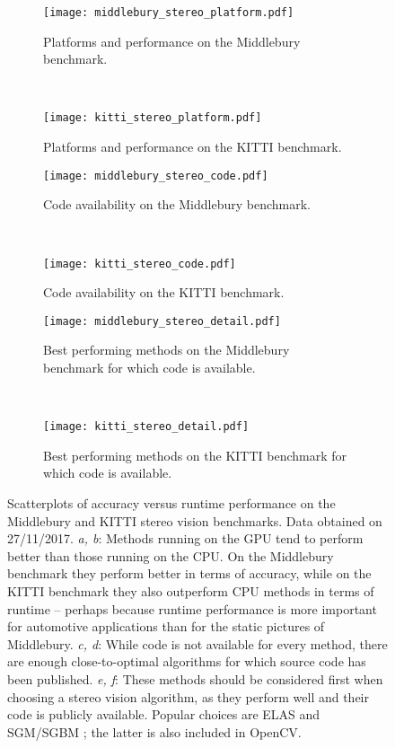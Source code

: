 \begin{figure}
\centering
\begin{subfigure}[t]{0.45\textwidth}
\centering
\texttt{[image: middlebury\_stereo\_platform.pdf]}
\caption{Platforms and performance on the Middlebury benchmark.}
\label{fig:mid_platform}
\end{subfigure}
~
\begin{subfigure}[t]{0.45\textwidth}
\centering
\texttt{[image: kitti\_stereo\_platform.pdf]}
\caption{Platforms and performance on the KITTI benchmark.}
\label{fig:kitti_platform}
\end{subfigure}

\begin{subfigure}[t]{0.45\textwidth}
\centering
\texttt{[image: middlebury\_stereo\_code.pdf]}
\caption{Code availability on the Middlebury benchmark.}
\end{subfigure}
~
\begin{subfigure}[t]{0.45\textwidth}
\centering
\texttt{[image: kitti\_stereo\_code.pdf]}
\caption{Code availability on the KITTI benchmark.}
\end{subfigure}

\begin{subfigure}[t]{0.45\textwidth}
\centering
\texttt{[image: middlebury\_stereo\_detail.pdf]}
\caption{Best performing methods on the Middlebury benchmark for which code is available.}
\end{subfigure}
~
\begin{subfigure}[t]{0.45\textwidth}
\centering
\texttt{[image: kitti\_stereo\_detail.pdf]}
\caption{Best performing methods on the KITTI benchmark for which code is available.}
\end{subfigure}
\caption{Scatterplots of accuracy versus runtime performance on the Middlebury and KITTI stereo vision benchmarks. Data obtained on 27/11/2017.
\emph{a, b}: Methods running on the GPU tend to perform better than those running on the CPU. On the Middlebury benchmark they perform better in terms of accuracy, while on the KITTI benchmark they also outperform CPU methods in terms of runtime -- perhaps because runtime performance is more important for automotive applications than for the static pictures of Middlebury.
\emph{c, d}: While code is not available for every method, there are enough close-to-optimal algorithms for which source code has been published.
\emph{e, f}: These methods should be considered first when choosing a stereo vision algorithm, as they perform well and their code is publicly available. Popular choices are \acs{ELAS} \cite{Geiger2011} and \acs{SGM}/\acs{SGBM} \cite{Hirschmuller2008}; the latter is also included in OpenCV.}
\label{fig:stereo_benchmark}
\end{figure}

